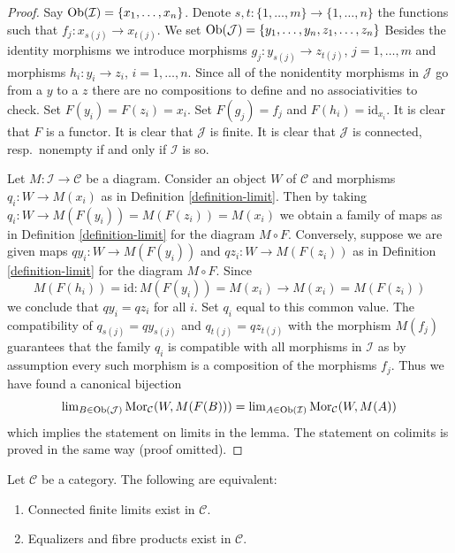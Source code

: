 \begin{proof}
Say $\mathop{\mathrm{Ob}}\nolimits(\mathcal{I}) = \{x_1, \ldots, x_n\}$.
Denote $s, t : \{1, \ldots, m\} \to \{1, \ldots, n\}$ the functions
such that $f_j : x_{s(j)} \to x_{t(j)}$.
We set $\mathop{\mathrm{Ob}}\nolimits(\mathcal{J}) = \{y_1, \ldots, y_n, z_1, \ldots, z_n\}$
Besides the identity morphisms we introduce morphisms
$g_j : y_{s(j)} \to z_{t(j)}$, $j = 1, \ldots, m$ and morphisms
$h_i : y_i \to z_i$, $i = 1, \ldots, n$. Since all of the nonidentity
morphisms in $\mathcal{J}$ go from a $y$ to a $z$ there are no
compositions to define and no associativities to check.
Set $F(y_i) = F(z_i) = x_i$. Set $F(g_j) = f_j$ and $F(h_i) = \text{id}_{x_i}$.
It is clear that $F$ is a functor.
It is clear that $\mathcal{J}$ is finite.
It is clear that $\mathcal{J}$ is connected, resp.\ nonempty
if and only if $\mathcal{I}$ is so.

\medskip\noindent
Let $M : \mathcal{I} \to \mathcal{C}$ be a diagram.
Consider an object $W$ of $\mathcal{C}$ and morphisms
$q_i : W \to M(x_i)$ as in
Definition \ref{definition-limit}.
Then by taking $q_i : W \to M(F(y_i)) = M(F(z_i)) = M(x_i)$ we obtain
a family of maps as in
Definition \ref{definition-limit}
for the diagram $M \circ F$.
Conversely, suppose we are given maps
$qy_i : W \to M(F(y_i))$ and $qz_i : W \to M(F(z_i))$
as in
Definition \ref{definition-limit}
for the diagram $M \circ F$. Since
$$
M(F(h_i)) = \text{id} : M(F(y_i)) = M(x_i) \longrightarrow M(x_i) = M(F(z_i))
$$
we conclude that $qy_i = qz_i$ for all $i$. Set $q_i$ equal to this common
value. The compatibility of
$q_{s(j)} = qy_{s(j)}$ and $q_{t(j)} = qz_{t(j)}$ with the morphism
$M(f_j)$ guarantees that the family $q_i$ is compatible with all morphisms
in $\mathcal{I}$ as by assumption every such morphism is a composition
of the morphisms $f_j$. Thus we have found a canonical bijection
$$
\mathop{\mathrm{lim}}\nolimits_{B \in \mathop{\mathrm{Ob}}\nolimits(\mathcal{J})} \mathop{\mathrm{Mor}}\nolimits_\mathcal{C}(W, M(F(B)))
=
\mathop{\mathrm{lim}}\nolimits_{A \in \mathop{\mathrm{Ob}}\nolimits(\mathcal{I})} \mathop{\mathrm{Mor}}\nolimits_\mathcal{C}(W, M(A))
$$
which implies the statement on limits in the lemma. The statement on colimits
is proved in the same way (proof omitted).
\end{proof}

\begin{lemma}
\label{lemma-fibre-products-equalizers-exist}
Let $\mathcal{C}$ be a category.
The following are equivalent:
\begin{enumerate}
\item Connected finite limits exist in $\mathcal{C}$.
\item Equalizers and fibre products exist in $\mathcal{C}$.
\end{enumerate}
\end{lemma}

